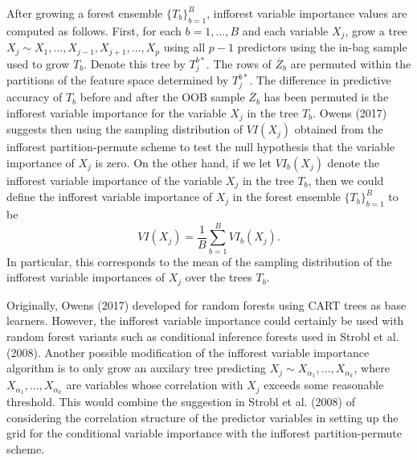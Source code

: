 \documentclass[12pt,twoside]{reedthesis}
\theoremstyle{definition}
\theoremstyle{definition}
\theoremstyle{definition}
\theoremstyle{remark}
\begin{document}
After growing a forest ensemble \(\{T_b\}_{b=1}^B\), infforest variable
importance values are computed as follows. First, for each
\(b=1,\ldots,B\) and each variable \(X_j\), grow a tree
\(X_j\sim X_1,\ldots,X_{j-1},X_{j+1},\ldots,X_p\) using all \(p-1\)
predictors using the in-bag sample used to grow \(T_b\). Denote this
tree by \(T_j^{b*}\). The rows of \(\overline{Z}_b\) are permuted within
the partitions of the feature space determined by \(T_j^{b*}\). The
difference in predictive accuracy of \(T_b\) before and after the OOB
sample \(\overline{Z}_b\) has been permuted is the infforest variable
importance for the variable \(X_j\) in the tree \(T_b\). Owens (2017)
suggests then using the sampling distribution of \(VI(X_j)\) obtained
from the infforest partition-permute scheme to test the null hypothesis
that the variable importance of \(X_j\) is zero. On the other hand, if
we let \(VI_b(X_j)\) denote the infforest variable importance of the
variable \(X_j\) in the tree \(T_b\), then we could define the infforest
variable importance of \(X_j\) in the forest ensemble
\(\{T_b\}_{b=1}^B\) to be \[VI(X_j)=\frac{1}{B}\sum_{b=1}^B VI_b(X_j).\]
In particular, this corresponds to the mean of the sampling distribution
of the infforest variable importances of \(X_j\) over the trees \(T_b\).

Originally, Owens (2017) developed for random forests using CART trees
as base learners. However, the infforest variable importance could
certainly be used with random forest variants such as conditional
inference forests used in Strobl et al. (2008). Another possible
modification of the infforest variable importance algorithm is to only
grow an auxilary tree predicting
\(X_j\sim X_{\alpha_1},\ldots,X_{\alpha_k}\), where
\(X_{\alpha_1},\ldots,X_{\alpha_k}\) are variables whose correlation
with \(X_j\) exceeds some reasonable threshold. This would combine the
suggestion in Strobl et al. (2008) of considering the correlation
structure of the predictor variables in setting up the grid for the
conditional variable importance with the infforest partition-permute
scheme.
\end{document}

